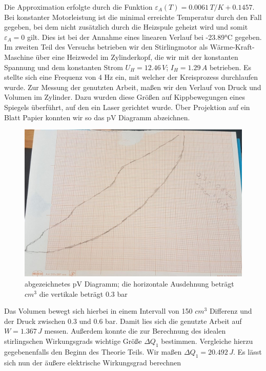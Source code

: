 \documentclass[a4paper, 12pt,]{scrartcl}
\begin{document}
Die Approximation erfolgte durch die Funktion $\varepsilon_A(T)=0.0061\,T/K+0.1457$. Bei konstanter Motorleistung ist die minimal erreichte Temperatur durch den Fall gegeben, bei dem nicht zusätzlich durch die Heizspule geheizt wird und somit $\varepsilon_A=0$ gilt. Dies ist bei der Annahme eines linearen Verlauf bei -23.89°C gegeben.\newline\newline
Im zweiten Teil des Versuchs betrieben wir den Stirlingmotor als Wärme-Kraft-Maschine über eine Heizwedel im Zylinderkopf, die wir mit der konstanten Spannung und dem konstanten Strom $U_H=12.46\,V$; $I_H=1.29\,A$ betrieben. Es stellte sich eine Frequenz von 4 Hz ein, mit welcher der Kreisprozess durchlaufen wurde. Zur Messung der genutzten Arbeit, maßen wir den Verlauf von Druck und Volumen im Zylinder. Dazu wurden diese Größen auf Kippbewegungen eines Spiegels überführt, auf den ein Laser gerichtet wurde. Über Projektion auf ein Blatt Papier konnten wir so das pV Diagramm abzeichnen.
\begin{figure}[H]\centering\includegraphics[scale=0.5]{pv diagramm2}\caption{abgezeichnetes pV Diagramm; die horizontale Ausdehnung beträgt  $cm^3$ die vertikale beträgt 0.3 bar}\end{figure}
Das Volumen bewegt sich hierbei in einem Intervall von 150 $cm^3$ Differenz und der Druck zwischen 0.3 und 0.6 bar. Damit lies sich die genutzte Arbeit auf  $W=1.367\,J$ messen. Außerdem konnte die zur Berechnung des idealen stirlingschen Wirkungsgrads wichtige Größe $\Delta{Q}_1$ bestimmen. Vergleiche hierzu gegebenenfalls den Beginn des Theorie Teils. Wir maßen $\Delta{Q}_1=20.492\,J$. Es lässt sich nun der äußere elektrische Wirkungsgrad berechnen
\end{document}
